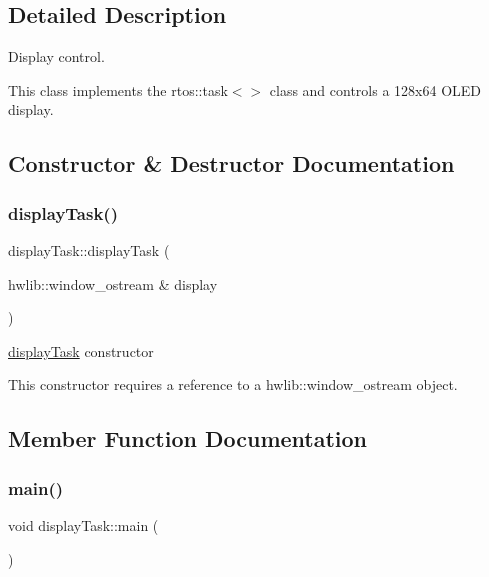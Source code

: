 \subsection{Detailed Description}
Display control. 

This class implements the rtos\+::task$<$$>$ class and controls a 128x64 O\+L\+ED display. 

\subsection{Constructor \& Destructor Documentation}
\mbox{\label{classdisplay_task_a6eaac17d19e3292654fb5c1bb952f5a7}} 
\subsubsection{\texorpdfstring{display\+Task()}{displayTask()}}
{\footnotesize\ttfamily display\+Task\+::display\+Task (\begin{DoxyParamCaption}\item[{hwlib\+::window\+\_\+ostream \&}]{display }\end{DoxyParamCaption})}



\mbox{\hyperlink{classdisplay_task}{display\+Task}} constructor 

This constructor requires a reference to a hwlib\+::window\+\_\+ostream object. 

\subsection{Member Function Documentation}
\mbox{\label{classdisplay_task_a8197696b737d9ff890833e2dcf93b546}} 
\subsubsection{\texorpdfstring{main()}{main()}}
{\footnotesize\ttfamily void display\+Task\+::main (\begin{DoxyParamCaption}{ }\end{DoxyParamCaption})\hspace{0.3cm}{\ttfamily [override]}}




